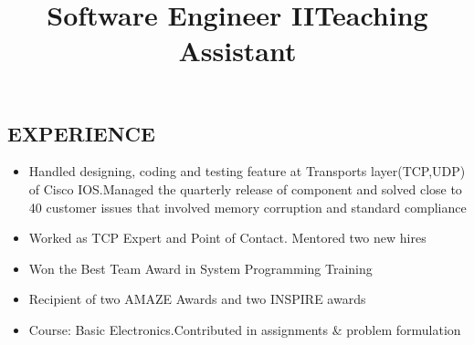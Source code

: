\documentclass[margin]{res}
\begin{document}
\begin{resume}
\section{EXPERIENCE}
\title{\textbf{Software Engineer II}}
\begin{position}
\vspace{-5mm}
\begin{itemize}[noitemsep,topsep=0pt]
	\item Handled designing, coding and testing feature  at Transports layer(TCP,UDP) of Cisco IOS.Managed the quarterly release of component and solved close to 40 customer issues that involved memory corruption and standard compliance
	\item Worked as TCP Expert and Point of Contact. Mentored two new hires
    \item Won the Best Team Award in System Programming Training 
 \item Recipient of  two AMAZE Awards  and two INSPIRE awards 
\end{itemize}
\end{position}
\title{\textbf{Teaching Assistant}}
\begin{position}
\vspace{-5mm}
\begin{itemize}[noitemsep,topsep=0pt]
\item Course: Basic Electronics.Contributed in assignments \& problem formulation
\end{itemize}
\end{position}

\end{resume}
\end{document}
